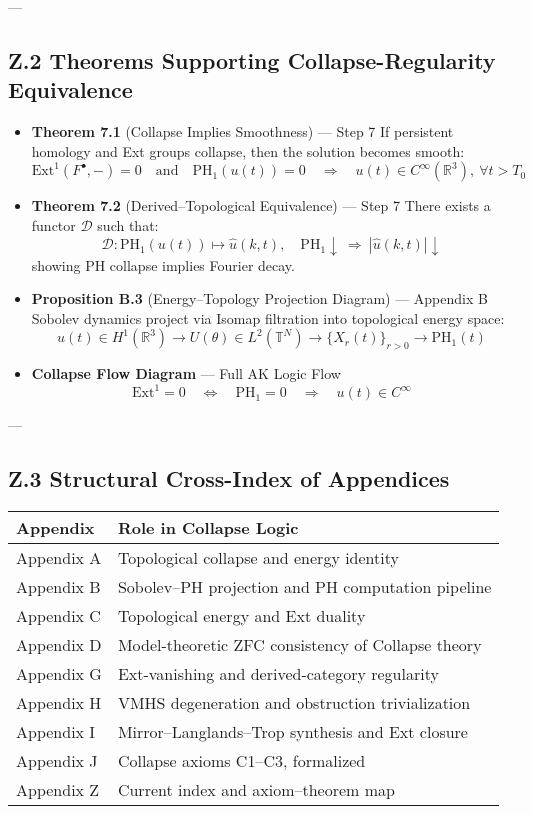 \documentclass[11pt]{article}
\theoremstyle{definition}
\begin{document}
---

\subsection*{Z.2 Theorems Supporting Collapse-Regularity Equivalence}

\begin{itemize}
  \item \textbf{Theorem 7.1} (Collapse Implies Smoothness) — Step 7  
    If persistent homology and Ext groups collapse, then the solution becomes smooth:
    \[
    \mathrm{Ext}^1(F^\bullet, -) = 0 \quad \text{and} \quad \mathrm{PH}_1(u(t)) = 0
    \quad \Rightarrow \quad u(t) \in C^\infty(\mathbb{R}^3), \ \forall t > T_0
    \]

  \item \textbf{Theorem 7.2} (Derived–Topological Equivalence) — Step 7  
    There exists a functor $\mathcal{D}$ such that:
    \[
    \mathcal{D} : \mathrm{PH}_1(u(t)) \longmapsto \widehat{u}(k,t), \quad
    \mathrm{PH}_1 \downarrow \ \Rightarrow \ |\widehat{u}(k,t)| \downarrow
    \]
    showing PH collapse implies Fourier decay.

  \item \textbf{Proposition B.3} (Energy–Topology Projection Diagram) — Appendix B  
    Sobolev dynamics project via Isomap filtration into topological energy space:
    \[
    u(t) \in H^1(\mathbb{R}^3)
    \to U(\theta) \in L^2(\mathbb{T}^N)
    \to \{X_r(t)\}_{r > 0} \to \mathrm{PH}_1(t)
    \]

  \item \textbf{Collapse Flow Diagram} — Full AK Logic Flow  
    \[
    \mathrm{Ext}^1 = 0 \quad \Longleftrightarrow \quad \mathrm{PH}_1 = 0 \quad \Longrightarrow \quad u(t) \in C^\infty
    \]
\end{itemize}

---

\subsection*{Z.3 Structural Cross-Index of Appendices}

\begin{tabular}{ll}
\textbf{Appendix} & \textbf{Role in Collapse Logic} \\
\hline
Appendix A & Topological collapse and energy identity \\
Appendix B & Sobolev–PH projection and PH computation pipeline \\
Appendix C & Topological energy and Ext duality \\
Appendix D & Model-theoretic ZFC consistency of Collapse theory \\
Appendix G & Ext-vanishing and derived-category regularity \\
Appendix H & VMHS degeneration and obstruction trivialization \\
Appendix I & Mirror–Langlands–Trop synthesis and Ext closure \\
Appendix J & Collapse axioms C1–C3, formalized \\
Appendix Z & Current index and axiom–theorem map \\
\end{tabular}
\end{document}
